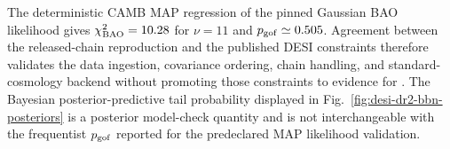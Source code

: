 The deterministic CAMB MAP regression of the pinned Gaussian BAO likelihood gives $\chi^2_{\rm BAO}=10.28$ for $\nu=11$ and $p_{\rm gof}\simeq0.505$. Agreement between the released-chain reproduction and the published DESI constraints therefore validates the data ingestion, covariance ordering, chain handling, and standard-cosmology backend without promoting those constraints to evidence for \SCPC{}. The Bayesian posterior-predictive tail probability displayed in Fig.~\ref{fig:desi-dr2-bbn-posteriors} is a posterior model-check quantity and is not interchangeable with the frequentist $p_{\rm gof}$ reported for the predeclared MAP likelihood validation.
